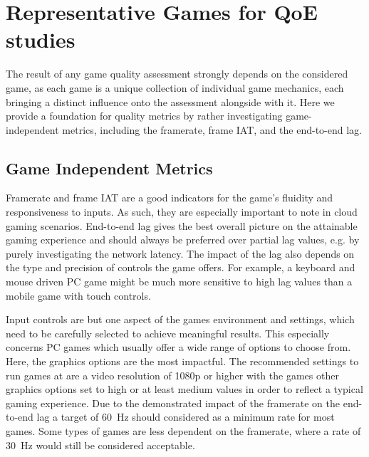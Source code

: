 \section{Representative Games for \acrshort{QoE} studies}
\label{sec:game-criteria}

The result of any game quality assessment strongly depends on the considered game, as each game is a unique collection of individual game mechanics, each bringing a distinct influence onto the assessment alongside with it. Here we provide a foundation for quality metrics by rather investigating game-independent metrics, including the framerate, frame \gls{IAT}, and the end-to-end lag.


\subsection{Game Independent Metrics}
Framerate and frame \gls{IAT} are a good indicators for the game's fluidity and responsiveness to inputs.
As such, they are especially important to note in cloud gaming scenarios.
End-to-end lag gives the best overall picture on the attainable gaming experience and should always be preferred over partial lag values, e.g. by purely investigating the network latency.
The impact of the lag also depends on the type and precision of controls the game offers.
For example, a keyboard and mouse driven PC game might be much more sensitive to high lag values than a mobile game with touch controls.

Input controls are but one aspect of the games environment and settings, which need to be carefully selected to achieve meaningful results.
This especially concerns PC games which usually offer a wide range of options to choose from.
Here, the graphics options are the most impactful.
The recommended settings to run games at are a video resolution of 1080p or higher with the games other graphics options set to high or at least medium values in order to reflect a typical gaming experience. 
Due to the demonstrated impact of the framerate on the end-to-end lag a target of \SI{60}{\hertz} should considered as a minimum rate for most games.
Some types of games are less dependent on the framerate, where a rate of \SI{30}{\hertz} would still be considered acceptable. 

